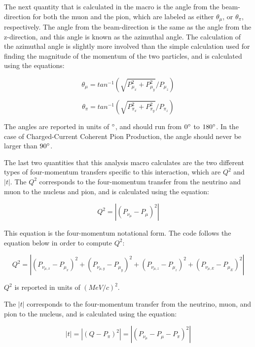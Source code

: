 \documentclass[11pt]{article}
\begin{document}
The next quantity that is calculated in the macro is the angle from the beam-direction for both the muon and the pion, which are labeled as either $\theta_\mu$, or $\theta_\pi$, respectively. The angle from the beam-direction is the same as the angle from the z-direction, and this angle is known as the azimuthal angle. The calculation of the azimuthal angle is slightly more involved than the simple calculation used for finding the magnitude of the momentum of the two particles, and is calculated using the equations:

\begin{equation}
\theta_\mu = tan^{-1}(\sqrt{P_{\mu_x}^2 + P_{\mu_y}^2}/{P_{\mu_z}})
\end{equation}

\begin{equation}
\theta_\pi = tan^{-1}(\sqrt{P_{\pi_x}^2 + P_{\pi_y}^2}/{P_{\pi_z}})
\end{equation}

\noindent
The angles are reported in units of $\degree$, and should run from $0\degree$ to $180\degree$. In the case of Charged-Current Coherent Pion Production, the angle should never be larger than $90\degree$.

The last two quantities that this analysis macro calculates are the two different types of four-momentum transfers specific to this interaction, which are $Q^2$ and $|t|$. The $Q^2$ corresponds to the four-momentum transfer from the neutrino and muon to the nucleus and pion, and is calculated using the equation:

\begin{equation}
Q^2 = |(P_{\nu_\mu} - P_\mu)^2|
\end{equation}

\noindent
This equation is the four-momentum notational form. The code follows the equation below in order to compute $Q^2$:

\begin{equation}
Q^2 = |(P_{\nu_{\mu,x}} - P_{\mu_x})^2 + (P_{\nu_{\mu,y}} - P_{\mu_y})^2 + (P_{\nu_{\mu,z}} - P_{\mu_z})^2 + (P_{\nu_{\mu,E}} - P_{\mu_E})^2|
\end{equation}

\noindent
$Q^2$ is reported in units of $(MeV/c)^2$.

The $|t|$ corresponds to the four-momentum transfer from the neutrino, muon, and pion to the nucleus, and is calculated using the equation:

\begin{equation}
|t| = |(Q - P_\pi)^2| = |(P_{\nu_\mu} - P_\mu - P_\pi)^2|
\end{equation}
\end{document}
